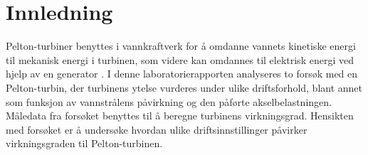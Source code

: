 \section*{Innledning}

Pelton-turbiner benyttes i vannkraftverk for å omdanne vannets kinetiske energi til mekanisk energi i turbinen, som videre kan omdannes til elektrisk energi ved hjelp av en generator \parencite{Turbiner}. I denne laboratorierapporten analyseres to forsøk med en Pelton-turbin, der turbinens ytelse vurderes under ulike driftsforhold, blant annet som funksjon av vannstrålens påvirkning og den påførte akselbelastningen. Måledata fra forsøket benyttes til å beregne turbinens virkningsgrad. Hensikten med forsøket er å undersøke hvordan ulike driftsinnstillinger påvirker virkningsgraden til Pelton-turbinen.